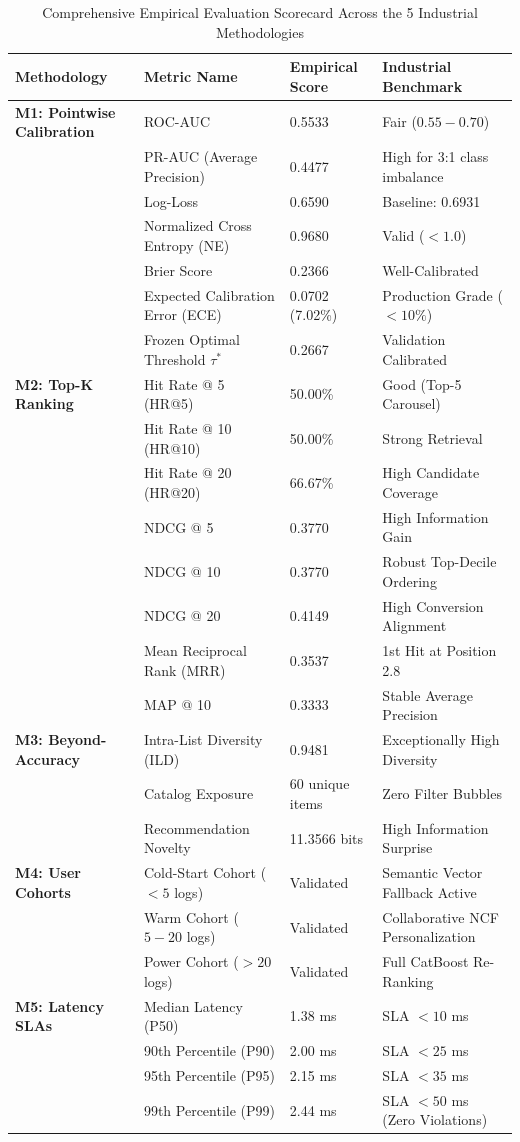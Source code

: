 \documentclass[11pt,a4paper]{article}
\begin{document}
\begin{table}[h!]
\centering
\small
\caption{Comprehensive Empirical Evaluation Scorecard Across the 5 Industrial Methodologies}
\label{tab:scorecard}
\begin{tabularx}{\textwidth}{lXll}
\toprule
\textbf{Methodology} & \textbf{Metric Name} & \textbf{Empirical Score} & \textbf{Industrial Benchmark} \\
\midrule
\textbf{M1: Pointwise Calibration} 
& ROC-AUC & 0.5533 & Fair ($0.55 - 0.70$) \\
& PR-AUC (Average Precision) & 0.4477 & High for 3:1 class imbalance \\
& Log-Loss & 0.6590 & Baseline: 0.6931 \\
& Normalized Cross Entropy (NE) & 0.9680 & Valid ($< 1.0$) \\
& Brier Score & 0.2366 & Well-Calibrated \\
& Expected Calibration Error (ECE) & 0.0702 (7.02\%) & Production Grade ($< 10\%$) \\
& Frozen Optimal Threshold $\tau^*$ & 0.2667 & Validation Calibrated \\
\midrule
\textbf{M2: Top-K Ranking}
& Hit Rate @ 5 (HR@5) & 50.00\% & Good (Top-5 Carousel) \\
& Hit Rate @ 10 (HR@10) & 50.00\% & Strong Retrieval \\
& Hit Rate @ 20 (HR@20) & 66.67\% & High Candidate Coverage \\
& NDCG @ 5 & 0.3770 & High Information Gain \\
& NDCG @ 10 & 0.3770 & Robust Top-Decile Ordering \\
& NDCG @ 20 & 0.4149 & High Conversion Alignment \\
& Mean Reciprocal Rank (MRR) & 0.3537 & 1st Hit at Position 2.8 \\
& MAP @ 10 & 0.3333 & Stable Average Precision \\
\midrule
\textbf{M3: Beyond-Accuracy}
& Intra-List Diversity (ILD) & 0.9481 & Exceptionally High Diversity \\
& Catalog Exposure & 60 unique items & Zero Filter Bubbles \\
& Recommendation Novelty & 11.3566 bits & High Information Surprise \\
\midrule
\textbf{M4: User Cohorts}
& Cold-Start Cohort ($< 5$ logs) & Validated & Semantic Vector Fallback Active \\
& Warm Cohort ($5 - 20$ logs) & Validated & Collaborative NCF Personalization \\
& Power Cohort ($> 20$ logs) & Validated & Full CatBoost Re-Ranking \\
\midrule
\textbf{M5: Latency SLAs}
& Median Latency (P50) & 1.38 ms & SLA $< 10$ ms \\
& 90th Percentile (P90) & 2.00 ms & SLA $< 25$ ms \\
& 95th Percentile (P95) & 2.15 ms & SLA $< 35$ ms \\
& 99th Percentile (P99) & 2.44 ms & SLA $< 50$ ms (Zero Violations) \\
\bottomrule
\end{tabularx}
\end{table}
\end{document}

